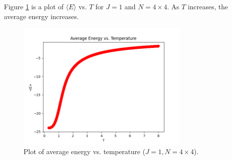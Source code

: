 \documentclass{article}
\begin{document}
\problem
Figure \ref{fig:fig3} is a plot of $\langle E \rangle$ vs. $T$ for $J = 1$ and $N = 4 \times 4$. As $T$ increases, the average energy increases.
\begin{figure}[!htb]
    \centering
    \includegraphics[width=0.75\textwidth]{../code/phy112l_lab5/5-5.png}
    \caption{Plot of average energy vs. temperature ($J = 1, N = 4 \times 4$).}
    \label{fig:fig3}
\end{figure}
\end{document}
